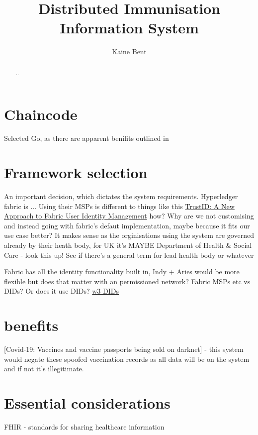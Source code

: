 \documentclass{article}
\title{Distributed Immunisation Information System}
\author{Kaine Bent}
\begin{document}
\begin{titlepage}
\maketitle
\end{titlepage}

\begin{abstract}
..
\end{abstract}

\begin{flushleft}

\section{Chaincode}
Selected Go, as there are apparent benifits outlined in \cite{foschini_hyperledger_2020}

\section{Framework selection}
An important decision, which dictates the system requirements. Hyperledger fabric is ... Using their MSPs is different to things like this \href{'https://www.hyperledger.org/blog/2020/04/21/trustid-a-new-approach-to-fabric-user-identity-management'}{TrustID: A New Approach to Fabric User Identity Management} how? Why are we not customising and instead going with fabric's defaut implementation, maybe because it fits our use case better? It makes sense as the orginisations using the system are governed already by their heath body, for UK it's MAYBE Department of Health \& Social Care - look this up! See if there's a general term for lead health body or whatever

Fabric has all the identity functionality built in, Indy + Aries would be more flexible but does that matter with an permissioned network? Fabric MSPs etc vs DIDs? Or does it use DIDs? \href{'https://www.w3.org/TR/did-core/'}{w3 DIDs}

\section{benefits}
[Covid-19: Vaccines and vaccine passports being sold on darknet] - this system would negate these spoofed vaccination records as all data will be on the system and if not it's illegitimate.
\linebreak[3]

\section{Essential considerations}
FHIR - standards for sharing healthcare information


\end{flushleft}
\end{document}
